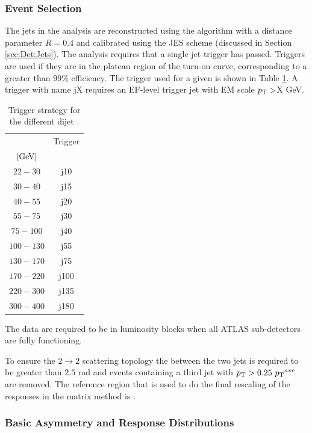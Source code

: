 \subsubsection{Event Selection}

The jets in the analysis are reconstructed using the \antikt{} algorithm with a distance parameter $R=0.4$ and calibrated using the JES scheme (discussed in Section \ref{sec:Det:Jets}).
The analysis requires that a single jet trigger has passed.
Triggers are used if they are in the plateau region of the turn-on curve, corresponding to a greater than $99\%$ efficiency.
The trigger used for a given \ptave{} is shown in Table \ref{JetPerf:Triggers}.
A trigger with name jX requires an EF-level trigger jet with EM scale $\mbox{$p_{\rm T}$}{}>$X GeV.
\begin{table}
\centering
\begin{tabular}{  c | c }
\hline
\hline
\ptave{} & Trigger\\
$[\rm GeV]$ & \\
\hline
$22-30$   & j10 \\
$30-40$   & j15 \\
$40-55$   & j20 \\
$55-75$   & j30 \\
$75-100$  & j40 \\
$100-130$ & j55 \\
$130-170$ & j75 \\
$170-220$ & j100 \\
$220-300$ & j135 \\
$300-400$ & j180 \\
\hline
\hline
\end{tabular}
\caption[Trigger strategy for dijet \pt{} balance in 2011]{
Trigger strategy for the different dijet \ptave{}. 
\label{JetPerf:Triggers}}
\end{table}
The data are required to be in luminosity blocks when all ATLAS sub-detectors are fully functioning. 

To ensure the $2\rightarrow2$ scattering topology the \dphi{} between the two jets is required to be greater than $2.5$ rad and events containing a third jet with $\mbox{$p_{\rm T}$}{} >0.25~ \mbox{$\mbox{$p_{\rm T}$}{}^{ave}$}{}$ are removed.
The reference region that is used to do the final rescaling of the responses in the matrix method is .

\subsubsection{Basic Asymmetry and Response Distributions}

